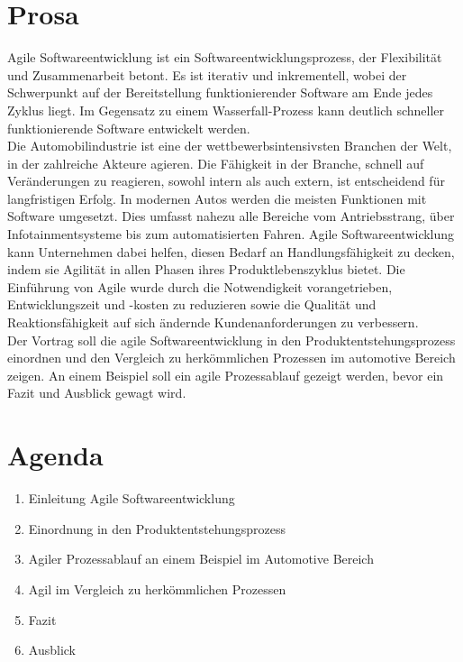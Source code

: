 \section*{Prosa}\label{prosa}
Agile Softwareentwicklung ist ein Softwareentwicklungsprozess, der Flexibilität und Zusammenarbeit betont. Es ist iterativ und inkrementell, wobei der Schwerpunkt auf der Bereitstellung funktionierender Software am Ende jedes Zyklus liegt. Im Gegensatz zu einem Wasserfall-Prozess kann deutlich schneller funktionierende Software entwickelt werden.\\

Die Automobilindustrie ist eine der wettbewerbsintensivsten Branchen der Welt, in der zahlreiche Akteure agieren. Die Fähigkeit in der Branche, schnell auf Veränderungen zu reagieren, sowohl intern als auch extern, ist entscheidend für langfristigen Erfolg. In modernen Autos werden die meisten Funktionen mit Software umgesetzt. Dies umfasst nahezu alle Bereiche vom Antriebsstrang, über Infotainmentsysteme bis zum automatisierten Fahren. Agile Softwareentwicklung kann Unternehmen dabei helfen, diesen Bedarf an Handlungsfähigkeit zu decken, indem sie Agilität in allen Phasen ihres Produktlebenszyklus bietet. Die Einführung von Agile wurde durch die Notwendigkeit vorangetrieben, Entwicklungszeit und -kosten zu reduzieren sowie die Qualität und Reaktionsfähigkeit auf sich ändernde Kundenanforderungen zu verbessern. \cite{Schlosser2016} \cite{katumba2014}\\

Der Vortrag \glqq\titleDocument\grqq{} soll die agile Softwareentwicklung in den Produktentstehungsprozess einordnen und den Vergleich zu herkömmlichen Prozessen im automotive Bereich zeigen. An einem Beispiel soll ein agile Prozessablauf gezeigt werden, bevor ein Fazit und Ausblick gewagt wird.\\

\section*{Agenda}
\begin{enumerate}
	\item Einleitung Agile Softwareentwicklung
	\item Einordnung in den Produktentstehungsprozess
	\item Agiler Prozessablauf an einem Beispiel im Automotive Bereich
	\item Agil im Vergleich zu herkömmlichen Prozessen
	\item Fazit
	\item Ausblick
\end{enumerate}